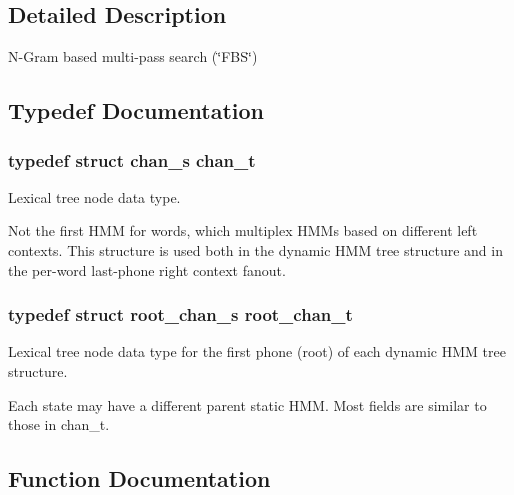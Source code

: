 \subsection{Detailed Description}
N-\/\+Gram based multi-\/pass search (\char`\"{}\+F\+B\+S\char`\"{}) 



\subsection{Typedef Documentation}
\subsubsection[{chan\+\_\+t}]{\setlength{\rightskip}{0pt plus 5cm}typedef struct {\bf chan\+\_\+s}  {\bf chan\+\_\+t}}\label{ngram__search_8h_a2c5740fe4792d870b73f4100b32e9324}


Lexical tree node data type. 

Not the first H\+M\+M for words, which multiplex H\+M\+Ms based on different left contexts. This structure is used both in the dynamic H\+M\+M tree structure and in the per-\/word last-\/phone right context fanout. 
\subsubsection[{root\+\_\+chan\+\_\+t}]{\setlength{\rightskip}{0pt plus 5cm}typedef struct {\bf root\+\_\+chan\+\_\+s}  {\bf root\+\_\+chan\+\_\+t}}\label{ngram__search_8h_aab8eee3f73f666d0e12c5b355a651cff}


Lexical tree node data type for the first phone (root) of each dynamic H\+M\+M tree structure. 

Each state may have a different parent static H\+M\+M. Most fields are similar to those in chan\+\_\+t. 

\subsection{Function Documentation}
